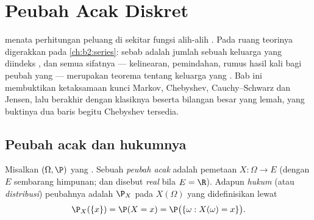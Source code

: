 \chapter{Peubah Acak Diskret}\label{ch:b2:randomvar}

 menata perhitungan peluang di sekitar
fungsi alih-alih . Pada ruang  teorinya
digerakkan  pada \cref{ch:b2:series}:
sebab  adalah jumlah sebuah keluarga yang diindeks ,
dan semua sifatnya --- kelinearan, pemindahan, rumus hasil kali
bagi peubah yang  --- merupakan teorema tentang keluarga
yang . Bab ini membuktikan ketaksamaan kunci Markov,
Chebyshev, Cauchy--Schwarz dan Jensen, lalu berakhir dengan 
klasiknya beserta  bilangan besar yang lemah, yang buktinya dua baris
begitu Chebyshev tersedia.

\section{Peubah acak dan hukumnya}

\begin{definition}\label{def:b2:randomvar:law}
Misalkan $(\Omega, \P)$  yang . Sebuah
\emph{peubah acak} adalah pemetaan $X \colon \Omega \to E$ (dengan $E$ sembarang
himpunan; dan disebut \emph{real} bila $E = \R$). Adapun \emph{hukum}
(atau \emph{distribusi}) peubahnya adalah  $\P_X$ pada
 $X(\Omega)$ yang didefinisikan lewat
\[
\P_X(\{x\}) = \P(X = x)
= \P\bigl(\{\omega : X(\omega) = x\}\bigr) .
\]
\end{definition}

